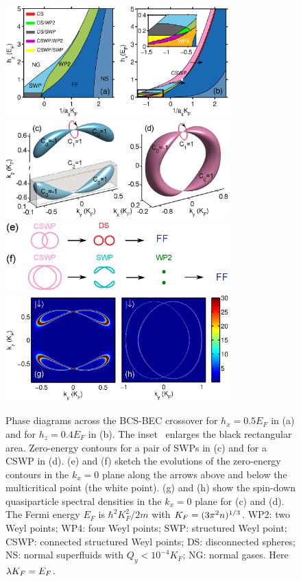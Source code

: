 \documentclass[prl,aps,twocolumn,showpacs,floatfix]{revtex4}
\begin{document}
\begin{figure}[t!]
\includegraphics[width=3.4in]{Fig2ab.eps} %
\includegraphics[width=3.4in]{Fig2cd.eps} %
\includegraphics[width=3.4in]{Fig2ef.eps} %
\includegraphics[width=3.4in]{Fig2gh.eps}
\caption{Phase diagrams across the BCS-BEC crossover for $h_{x}=0.5E_{F}$ in
(a) and for $h_{z}=0.4E_{F}$ in (b). The inset~\protect\cite{touching4}
enlarges the black rectangular area. Zero-energy contours for a pair of SWPs
in (c) and for a CSWP in (d). (e) and (f) sketch the evolutions of the
zero-energy contours in the $k_{x}=0$ plane along the arrows above and below
the multicritical point (the white point). (g) and (h) show the spin-down
quasiparticle spectral densities in the $k_{x}=0$ plane for (c) and (d). The
Fermi energy $E_{F}$ is $\hbar^{2}K_{F}^{2}/2m$ with $K_{F}=(3\protect\pi%
^{2}n)^{1/3}$. WP2: two Weyl points; WP4: four Weyl points; SWP: structured
Weyl point; CSWP: connected structured Weyl points; DS: disconnected
spheres; NS: normal superfluids with $Q_{y}<10^{-4}K_{F}$; NG: normal gases.
Here $\protect\lambda K_{F}=E_{F}$. }
\label{phase}
\end{figure}
\end{document}
